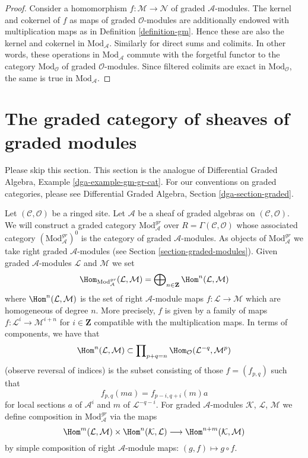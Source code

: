 \begin{proof}
Consider a homomorphism $f : \mathcal{M} \to \mathcal{N}$
of graded $\mathcal{A}$-modules. The kernel
and cokernel of $f$ as maps of graded $\mathcal{O}$-modules
are additionally endowed with multiplication maps as in
Definition \ref{definition-gm}. Hence these are also
the kernel and cokernel in $\text{Mod}_\mathcal{A}$.
Similarly for direct sums and colimits. In other words, these operations
in $\text{Mod}_\mathcal{A}$ commute with the
forgetful functor to the category $\text{Mod}_\mathcal{O}$
of graded $\mathcal{O}$-modules. Since filtered colimits
are exact in $\text{Mod}_\mathcal{O}$, the same is true in
$\text{Mod}_\mathcal{A}$.
\end{proof}






\section{The graded category of sheaves of graded modules}
\label{section-gm-gr-cat}

\noindent
Please skip this section. This section is the analogue of
Differential Graded Algebra, Example \ref{dga-example-gm-gr-cat}.
For our conventions on graded categories, please see
Differential Graded Algebra, Section \ref{dga-section-graded}.

\medskip\noindent
Let $(\mathcal{C}, \mathcal{O})$ be a ringed site.
Let $\mathcal{A}$ be a sheaf of graded algebras
on $(\mathcal{C}, \mathcal{O})$. We will construct
a graded category $\text{Mod}^{gr}_\mathcal{A}$ over
$R = \Gamma(\mathcal{C}, \mathcal{O})$
whose associated category $(\text{Mod}^{gr}_\mathcal{A})^0$
is the category of graded $\mathcal{A}$-modules. As objects
of $\text{Mod}^{gr}_\mathcal{A}$ we take right graded
$\mathcal{A}$-modules (see
Section \ref{section-graded-modules}). Given graded
$\mathcal{A}$-modules $\mathcal{L}$ and $\mathcal{M}$ we set
$$
\Hom_{\text{Mod}^{gr}_\mathcal{A}}(\mathcal{L}, \mathcal{M}) =
\bigoplus\nolimits_{n \in \mathbf{Z}} \Hom^n(\mathcal{L}, \mathcal{M})
$$
where
$\Hom^n(\mathcal{L}, \mathcal{M})$
is the set of right $\mathcal{A}$-module maps
$f : \mathcal{L} \to \mathcal{M}$ which
are homogeneous of degree $n$. More precisely, $f$ is given
by a family of maps $f : \mathcal{L}^i \to \mathcal{M}^{i + n}$
for $i \in \mathbf{Z}$ compatible with the multiplication
maps. In terms of components, we have that
$$
\Hom^n(\mathcal{L}, \mathcal{M})
\subset
\prod\nolimits_{p + q = n}
\Hom_\mathcal{O}(\mathcal{L}^{-q}, \mathcal{M}^p)
$$
(observe reversal of indices) is the subset consisting of those
$f = (f_{p, q})$ such that
$$
f_{p, q}(m a) = f_{p - i, q + i}(m)a
$$
for local sections $a$ of $\mathcal{A}^i$ and
$m$ of $\mathcal{L}^{-q - i}$. For graded $\mathcal{A}$-modules
$\mathcal{K}$, $\mathcal{L}$, $\mathcal{M}$
we define composition in $\text{Mod}^{gr}_\mathcal{A}$ via
the maps
$$
\Hom^m(\mathcal{L}, \mathcal{M}) \times
\Hom^n(\mathcal{K}, \mathcal{L}) \longrightarrow
\Hom^{n + m}(\mathcal{K}, \mathcal{M})
$$
by simple composition of right
$\mathcal{A}$-module maps: $(g, f) \mapsto g \circ f$.





